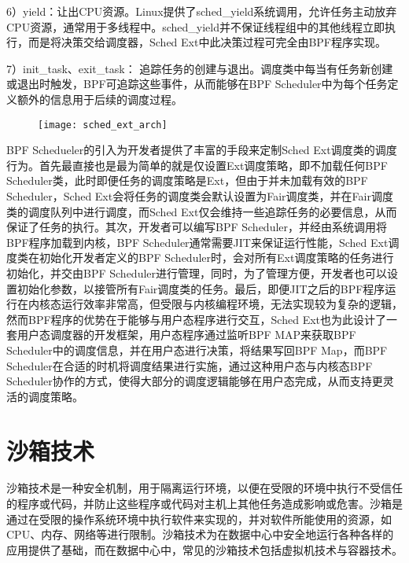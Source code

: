 6）yield：让出CPU资源。Linux提供了sched\_yield系统调用，允许任务主动放弃CPU资源，通常用于多线程中。sched\_yield并不保证线程组中的其他线程立即执行，而是将决策交给调度器，Sched Ext中此决策过程可完全由BPF程序实现。

7）init\_task、exit\_task： 追踪任务的创建与退出。调度类中每当有任务新创建或退出时触发，BPF可追踪这些事件，从而能够在BPF Scheduler中为每个任务定义额外的信息用于后续的调度过程。

\begin{figure}[!htbp]
    \centering
    \texttt{[image: sched\_ext\_arch]}
    \label{fig:sched_ext_arch}
\end{figure}

BPF Schedueler的引入为开发者提供了丰富的手段来定制Sched Ext调度类的调度行为。首先最直接也是最为简单的就是仅设置Ext调度策略，即不加载任何BPF Scheduler类，此时即便任务的调度策略是Ext，但由于并未加载有效的BPF Scheduler，Sched Ext会将任务的调度类会默认设置为Fair调度类，并在Fair调度类的调度队列中进行调度，而Sched Ext仅会维持一些追踪任务的必要信息，从而保证了任务的执行。其次，开发者可以编写BPF Scheduler，并经由系统调用将BPF程序加载到内核，BPF Scheduler通常需要JIT来保证运行性能，Sched Ext调度类在初始化开发者定义的BPF Scheduler时，会对所有Ext调度策略的任务进行初始化，并交由BPF Scheduler进行管理，同时，为了管理方便，开发者也可以设置初始化参数，以接管所有Fair调度类的任务。最后，即便JIT之后的BPF程序运行在内核态运行效率非常高，但受限与内核编程环境，无法实现较为复杂的逻辑，然而BPF程序的优势在于能够与用户态程序进行交互，Sched Ext也为此设计了一套用户态调度器的开发框架，用户态程序通过监听BPF MAP来获取BPF Scheduler中的调度信息，并在用户态进行决策，将结果写回BPF Map，而BPF Scheduler在合适的时机将调度结果进行实施，通过这种用户态与内核态BPF Scheduler协作的方式，使得大部分的调度逻辑能够在用户态完成，从而支持更灵活的调度策略。

\section{沙箱技术}


沙箱技术是一种安全机制，用于隔离运行环境，以便在受限的环境中执行不受信任的程序或代码，并防止这些程序或代码对主机上其他任务造成影响或危害。沙箱是通过在受限的操作系统环境中执行软件来实现的，并对软件所能使用的资源，如CPU、内存、网络等进行限制。沙箱技术为在数据中心中安全地运行各种各样的应用提供了基础，而在数据中心中，常见的沙箱技术包括虚拟机技术与容器技术。

